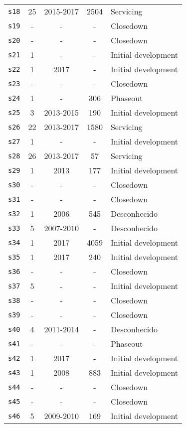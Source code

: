 \begin{longtable}{ l c c c l }
    \texttt{s18} & 25 & 2015-2017 & 2504 & Servicing \\
    \texttt{s19} & - & - & - & Closedown \\
    \texttt{s20} & - & - & - & Closedown \\
    \texttt{s21} & 1 & - & - & Initial development \\
    \texttt{s22} & 1 & 2017 & - & Initial development \\
    \texttt{s23} & - & - & - & Closedown \\
    \texttt{s24} & 1 & - & 306 & Phaseout \\
    \texttt{s25} & 3 & 2013-2015 & 190 & Initial development \\
    \texttt{s26} & 22 & 2013-2017 & 1580 & Servicing \\
    \texttt{s27} & 1 & - & - & Initial development \\
    \texttt{s28} & 26 & 2013-2017 & 57 & Servicing \\
    \texttt{s29} & 1 & 2013 & 177 & Initial development \\
    \texttt{s30} & - & - & - & Closedown \\
    \texttt{s31} & - & - & - & Closedown \\
    \texttt{s32} & 1 & 2006 & 545 & Desconhecido \\
    \texttt{s33} & 5 & 2007-2010 & - & Desconhecido \\
    \texttt{s34} & 1 & 2017 & 4059 & Initial development \\
    \texttt{s35} & 1 & 2017 & 240 & Initial development \\
    \texttt{s36} & - & - & - & Closedown \\
    \texttt{s37} & 5 & - & - & Initial development \\
    \texttt{s38} & - & - & - & Closedown \\
    \texttt{s39} & - & - & - & Closedown \\
    \texttt{s40} & 4 & 2011-2014 & - & Desconhecido \\
    \texttt{s41} & - & - & - & Phaseout \\
    \texttt{s42} & 1 & 2017 & - & Initial development \\
    \texttt{s43} & 1 & 2008 & 883 & Initial development \\
    \texttt{s44} & - & - & - & Closedown \\
    \texttt{s45} & - & - & - & Closedown \\
    \texttt{s46} & 5 & 2009-2010 & 169 & Initial development \\

\end{longtable}
